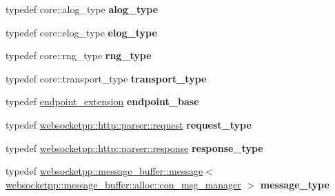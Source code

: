 \begin{DoxyCompactItemize}
\item 
typedef core\+::alog\+\_\+type {\bfseries alog\+\_\+type}\hypertarget{structstub__config_a0d27080bdc8a484a1c742853bcc92673}{}\label{structstub__config_a0d27080bdc8a484a1c742853bcc92673}

\item 
typedef core\+::elog\+\_\+type {\bfseries elog\+\_\+type}\hypertarget{structstub__config_a48001c3d916c6e12404be8ce13e7c06d}{}\label{structstub__config_a48001c3d916c6e12404be8ce13e7c06d}

\item 
typedef core\+::rng\+\_\+type {\bfseries rng\+\_\+type}\hypertarget{structstub__config_ab451127820621a9c8acf60b8f8ce62b8}{}\label{structstub__config_ab451127820621a9c8acf60b8f8ce62b8}

\item 
typedef core\+::transport\+\_\+type {\bfseries transport\+\_\+type}\hypertarget{structstub__config_aaada21529a6fe3cb91d8621b4b6f77ff}{}\label{structstub__config_aaada21529a6fe3cb91d8621b4b6f77ff}

\item 
typedef \hyperlink{structendpoint__extension}{endpoint\+\_\+extension} {\bfseries endpoint\+\_\+base}\hypertarget{structstub__config_ad3a796f835108e68c135f7a658e6e847}{}\label{structstub__config_ad3a796f835108e68c135f7a658e6e847}

\item 
typedef \hyperlink{classwebsocketpp_1_1http_1_1parser_1_1request}{websocketpp\+::http\+::parser\+::request} {\bfseries request\+\_\+type}\hypertarget{structstub__config_a7d7d444e1d7b2882bf22746be5c25f37}{}\label{structstub__config_a7d7d444e1d7b2882bf22746be5c25f37}

\item 
typedef \hyperlink{classwebsocketpp_1_1http_1_1parser_1_1response}{websocketpp\+::http\+::parser\+::response} {\bfseries response\+\_\+type}\hypertarget{structstub__config_af1ff5c46d4fc72bce3b5fb9f6090f4d6}{}\label{structstub__config_af1ff5c46d4fc72bce3b5fb9f6090f4d6}

\item 
typedef \hyperlink{classwebsocketpp_1_1message__buffer_1_1message}{websocketpp\+::message\+\_\+buffer\+::message}$<$ \hyperlink{classwebsocketpp_1_1message__buffer_1_1alloc_1_1con__msg__manager}{websocketpp\+::message\+\_\+buffer\+::alloc\+::con\+\_\+msg\+\_\+manager} $>$ {\bfseries message\+\_\+type}\hypertarget{structstub__config_a251ee9935f06ff126dbdcae6af183493}{}\label{structstub__config_a251ee9935f06ff126dbdcae6af183493}


\end{DoxyCompactItemize}
